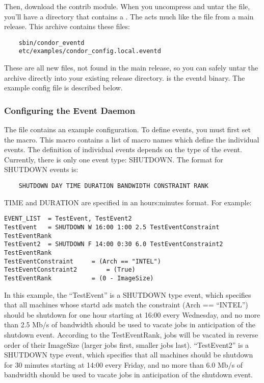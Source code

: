 Then, download the  contrib module.
When you uncompress and untar the file, you'll have a directory that
contains a .
The  acts much like the  file from
a main release.
This archive contains these files:
\begin{verbatim}
	sbin/condor_eventd
	etc/examples/condor_config.local.eventd
\end{verbatim}
These are all new files, not found in the main release, so you can
safely untar the archive directly into your existing release
directory.
 is the eventd binary.
The example config file is described below.

\subsubsection{\label{sec:EventD-Configuration}
Configuring the Event Daemon} 

The file  contains an
example  configuration.
To define events, you must first set the  macro.
This macro contains a list of macro names which define the individual
events.
The definition of individual events depends on the type of the event.
Currently, there is only one event type: SHUTDOWN.
The format for SHUTDOWN events is:
\begin{verbatim}
	SHUTDOWN DAY TIME DURATION BANDWIDTH CONSTRAINT RANK
\end{verbatim}
TIME and DURATION are specified in an hours:minutes format.
For example:
\begin{verbatim}
EVENT_LIST	= TestEvent, TestEvent2
TestEvent	= SHUTDOWN W 16:00 1:00 2.5 TestEventConstraint TestEventRank
TestEvent2	= SHUTDOWN F 14:00 0:30 6.0 TestEventConstraint2 TestEventRank
TestEventConstraint		= (Arch == "INTEL")
TestEventConstraint2		= (True)
TestEventRank			= (0 - ImageSize)
\end{verbatim}
In this example, the ``TestEvent'' is a SHUTDOWN type event, which
specifies that all machines whose startd ads match the constraint
(Arch == ``INTEL'') should be shutdown for one hour starting at
16:00 every Wednesday, and no more than 2.5 Mb/s of bandwidth
should be used to vacate jobs in anticipation of the shutdown
event.  According to the TestEventRank, jobs will be vacated in
reverse order of their ImageSize (larger jobs first, smaller jobs
last).  ``TestEvent2'' is a SHUTDOWN type event, which specifies
that all machines should be shutdown for 30 minutes starting at
14:00 every Friday, and no more than 6.0 Mb/s of bandwidth should
be used to vacate jobs in anticipation of the shutdown event.

